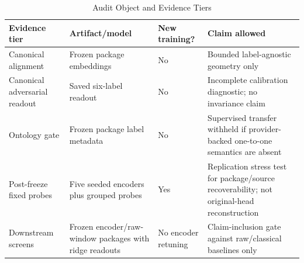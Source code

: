 \documentclass[journal]{IEEEtran}
\begin{document}
\begin{table}[t]
\caption{Audit Object and Evidence Tiers}
\label{tab:evidencetiers}
\centering
\footnotesize
\begin{tabularx}{\columnwidth}{@{}p{1.60cm}p{1.65cm}p{1.0cm}Y@{}}
\toprule
Evidence tier & Artifact/model & New training? & Claim allowed \\
\midrule
Canonical alignment & Frozen package embeddings & No & Bounded label-agnostic geometry only \\
Canonical adversarial readout & Saved six-label readout & No & Incomplete calibration diagnostic; no invariance claim \\
Ontology gate & Frozen package label metadata & No & Supervised transfer withheld if provider-backed one-to-one semantics are absent \\
Post-freeze fixed probes & Five seeded encoders plus grouped probes & Yes & Replication stress test for package/source recoverability; not original-head reconstruction \\
Downstream screens & Frozen encoder/raw-window packages with ridge readouts & No encoder retuning & Claim-inclusion gate against raw/classical baselines only \\
\bottomrule
\end{tabularx}
\end{table}
\end{document}
